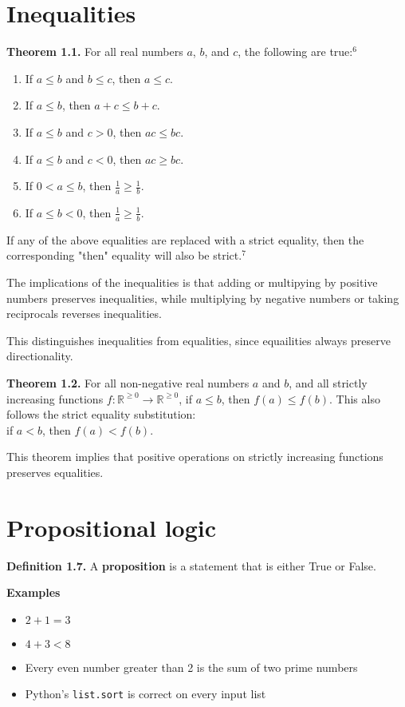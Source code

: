 \documentclass{article}
\begin{document}
\newpage
\section{Inequalities}
\textbf{Theorem 1.1.} For all real numbers $a$, $b$, and $c$, the following are true:$^{6}$
\begin{enumerate}[label=(\alph*)]
    \item If $a \leq b$ and $b \leq c$, then $a \leq c$.
    \item If $a \leq b$, then $a + c \leq b + c$.
    \item If $a \leq b$ and $c > 0$, then $ac \leq bc$.
    \item If $a \leq b$ and $c < 0$, then $ac \geq bc$.
    \item If $0 < a \leq b$, then $\frac{1}{a} \geq \frac{1}{b}$.
    \item If $a \leq b < 0 $, then $\frac{1}{a} \geq \frac{1}{b}$.
\end{enumerate}
If any of the above equalities are replaced with a strict equality, then the 
corresponding "then" equality will also be strict.$^7$

The implications of the inequalities is that adding or multipying by positive
numbers preserves inequalities, while multiplying by negative numbers or
taking reciprocals reverses inequalities. 

This distinguishes inequalities from equalities, since equailities always
preserve directionality. 

\textbf{Theorem 1.2.} For all non-negative real numbers $a$ and $b$, and
all strictly increasing functions $f : \mathbb{R}^{\geq 0} \to \mathbb{R}^{\geq 0}$,
if $a \leq b$, then $f(a) \leq f(b) $. This also follows the strict equality substitution: \\
if $a < b$, then $f(a) < f(b)$. 

This theorem implies that positive operations on strictly increasing functions
preserves equalities.

\section{Propositional logic}
\textbf{Definition 1.7.} A \textbf{proposition} is a statement that is either
True or False.

\textbf{Examples} 
\begin{itemize}
    \item $ 2 + 1 = 3$
    \item $ 4 + 3 < 8$
    \item Every even number greater than 2 is the sum of two prime numbers
    \item Python's \verb|list.sort| is correct on every input list
    
\end{itemize}
\end{document}
